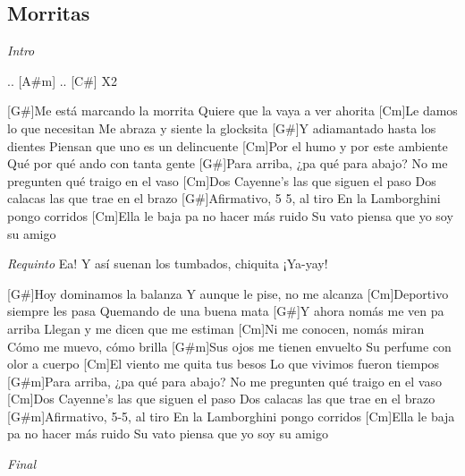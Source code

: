 \subsection{Morritas}

\noindent
\vspace{1cm}

\begin{guitar}
	\begin{multicols}{2}

		\textit{Intro}\par
		[G#]  ..  [A#m]  ..  [C#] X2

		[G#]Me está marcando la morrita
		Quiere que la vaya a ver ahorita
		[Cm]Le damos lo que necesitan
		Me abraza y siente la glocksita
		[G#]Y adiamantado hasta los dientes
		Piensan que uno es un delincuente
		[Cm]Por el humo y por este ambiente
		Qué por qué ando con tanta gente
		[G#]Para arriba, ¿pa qué para abajo?
		No me pregunten qué traigo en el vaso
		[Cm]Dos Cayenne's las que siguen el paso
		Dos calacas las que trae en el brazo
		[G#]Afirmativo, 5 5, al tiro
		En la Lamborghini pongo corridos
		[Cm]Ella le baja pa no hacer más ruido
		Su vato piensa que yo soy su amigo

		\par
		\textit{Requinto}
		Ea!
		Y así suenan los tumbados, chiquita
		¡Ya-yay!
		\par

		[G#]Hoy dominamos la balanza
		Y aunque le pise, no me alcanza
		[Cm]Deportivo siempre les pasa
		Quemando de una buena mata
		[G#]Y ahora nomás me ven pa arriba
		Llegan y me dicen que me estiman
		[Cm]Ni me conocen, nomás miran
		Cómo me muevo, cómo brilla
		[G#m]Sus ojos me tienen envuelto
		Su perfume con olor a cuerpo
		[Cm]El viento me quita tus besos
		Lo que vivimos fueron tiempos
		[G#m]Para arriba, ¿pa qué para abajo?
		No me pregunten qué traigo en el vaso
		[Cm]Dos Cayenne's las que siguen el paso
		Dos calacas las que trae en el brazo
		[G#m]Afirmativo, 5-5, al tiro
		En la Lamborghini pongo corridos
		[Cm]Ella le baja pa no hacer más ruido
		Su vato piensa que yo soy su amigo
		\par
		\textit{Final}


	\end{multicols}
\end{guitar}
